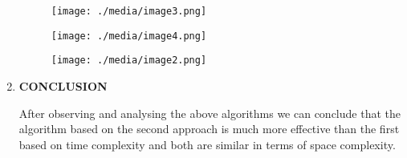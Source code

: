 \documentclass[12pt]{article}
\renewcommand{\_}{\kern-1.5pt\textunderscore\kern-1.5pt}
\begin{document}
\begin{multicols}{2}
\begin{enumerate}
\begin{figure}[H]
	\begin{Center}
		\texttt{[image: ./media/image3.png]}
	\end{Center}
\end{figure}



\par


\vspace{\baselineskip}



\begin{figure}[H]
	\begin{Center}
		\texttt{[image: ./media/image4.png]}
	\end{Center}
\end{figure}



\par


\vspace{\baselineskip}



\begin{figure}[H]
	\begin{Center}
		\texttt{[image: ./media/image2.png]}
	\end{Center}
\end{figure}



\par


\vspace{\baselineskip}

\vspace{\baselineskip}
	\item \textbf{CONCLUSION}\par

After observing and analysing the above algorithms we can conclude that the algorithm based on the second approach is much more effective than the first based on time complexity and both are similar in terms of space complexity.\par



\end{enumerate}
\end{multicols}
\end{document}
